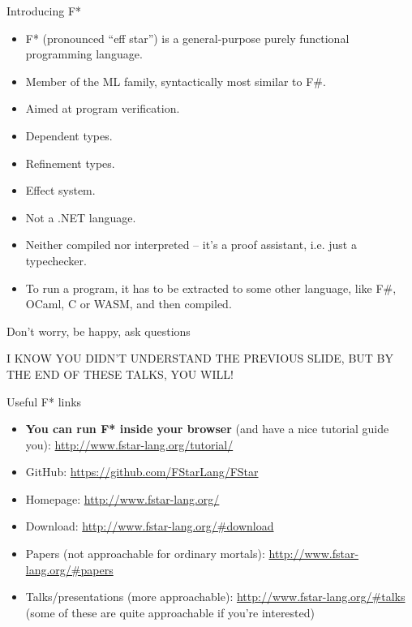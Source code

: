 \documentclass{beamer}
\begin{document}
\begin{frame}{Introducing F*}
\begin{itemize}
	\item F* (pronounced ``eff star'') is a general-purpose purely functional programming language.
	\item Member of the ML family, syntactically most similar to F\#.
	\item Aimed at program verification.
	\item Dependent types.
	\item Refinement types.
	\item Effect system.
	\item Not a .NET language.
	\item Neither compiled nor interpreted -- it's a proof assistant, i.e. just a typechecker.
	\item To run a program, it has to be extracted to some other language, like F\#, OCaml, C or WASM, and then compiled.
\end{itemize}
\end{frame}

\begin{frame}{Don't worry, be happy, ask questions}
\begin{center}
	\color{red}
	I KNOW YOU DIDN'T UNDERSTAND THE PREVIOUS SLIDE, BUT BY THE END OF THESE TALKS, YOU WILL!
\end{center}
\end{frame}

\begin{frame}{Useful F* links}
\begin{itemize}
	\item \textbf{You can run F* inside your browser} (and have a nice tutorial guide you): \url{http://www.fstar-lang.org/tutorial/}
	\item GitHub: \url{https://github.com/FStarLang/FStar}
	\item Homepage: \url{http://www.fstar-lang.org/}
	\item Download: \url{http://www.fstar-lang.org/\#download}
	\item Papers (not approachable for ordinary mortals): \url{http://www.fstar-lang.org/\#papers}
	\item Talks/presentations (more approachable): \url{http://www.fstar-lang.org/\#talks} (some of these are quite approachable if you're interested)  
\end{itemize}
\end{frame}
\end{document}
